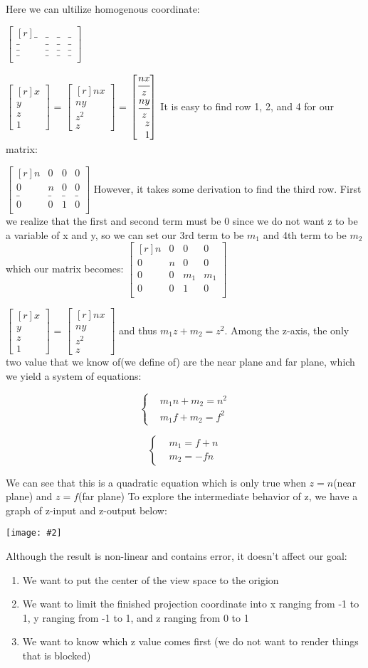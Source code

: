 \documentclass[11pt]{article}
\newcommand{\image}[2]{\texttt{[image: \#2]}}
\newcommand{\twolinesplit}[3]{
    \begin{equation*}
        #1
        \begin{cases}
             & #2   \\
             & #3
        \end{cases}
    \end{equation*}
}
\newcommand{\mat}[1]{
    $\begin{bmatrix*}[r]
        #1
    \end{bmatrix*}$
} %
\newcommand{\gap}{\vspace*{0.5cm}}
\begin{document}
Here we can ultilize homogenous coordinate:
\mat{
    \_ & \_ & \_ & \_ \\
    \_ & \_ & \_ & \_ \\
    \_ & \_ & \_ & \_ \\
    \_ & \_ & \_ & \_ \\
} \mat{
    x \\ y \\ z \\ 1
} = \mat{
    nx \\ ny \\ z^2 \\ z
} = \mat{
    \cfrac{nx}{z} \\ \cfrac{ny}{z} \\ z \\ 1
} \gap
It is easy to find row 1, 2, and 4 for our matrix:
\mat{
    n & 0 & 0 & 0 \\
    0 & n & 0 & 0 \\
    \_ & \_ & \_ & \_ \\
    0 & 0 & 1 & 0 \\
} However, it takes some derivation to find the third row. First we realize that the first and second term must be 0 since we do not want z to be a variable of x and y, so we can set our 3rd term to be $m_1$ and 4th term to be $m_2$
which our matrix becomes:\mat{
    n & 0 & 0 & 0 \\
    0 & n & 0 & 0 \\
    0 & 0 & m_1 & m_1 \\
    0 & 0 & 1 & 0 \\
} \mat{
    x \\ y \\ z \\ 1
} = \mat{
    nx \\ ny \\ z^2 \\ z
} and thus $m_1z + m_2 = z^2$. Among the z-axis, the only two value that we know of(we define of) are the near plane and far plane, which we yield a system of equations:
\twolinesplit{}{m_1n+m_2=n^2}{m_1f+m_2 = f^2}
\twolinesplit{}{m_1=f+n}{m_2 = -fn}
We can see that this is a quadratic equation which is only true when $z = n$(near plane) and $z = f$(far plane) To explore the intermediate behavior of z, we have a graph of z-input and z-output below:
\begin{center}
    \image{0.7}{find_z}
\end{center}
Although the result is non-linear and contains error, it doesn't affect our goal:
\begin{enumerate}
    \item We want to put the center of the view space to the origion
    \item We want to limit the finished projection coordinate into x ranging from -1 to 1, y ranging from -1 to 1, and z ranging from 0 to 1
    \item We want to know which z value comes first (we do not want to render things that is blocked)
\end{enumerate}
\end{document}
